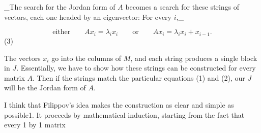 _The search for the Jordan form of \(A\) becomes a search for these strings of vectors, each one headed by an eigenvector: For every \(i\),_

\[\text{either}\qquad Ax_{i}=\lambda_{i}x_{i}\qquad\text{or}\qquad Ax_{i}= \lambda_{i}x_{i}+x_{i-1}.\] (3)

The vectors \(x_{i}\) go into the columns of \(M\), and each string produces a single block in \(J\). Essentially, we have to show how these strings can be constructed for every matrix \(A\). Then if the strings match the particular equations (1) and (2), our \(J\) will be the Jordan form of \(A\).

I think that Filippov's idea makes the construction as clear and simple as possible1. It proceeds by mathematical induction, starting from the fact that every 1 by 1 matrix 